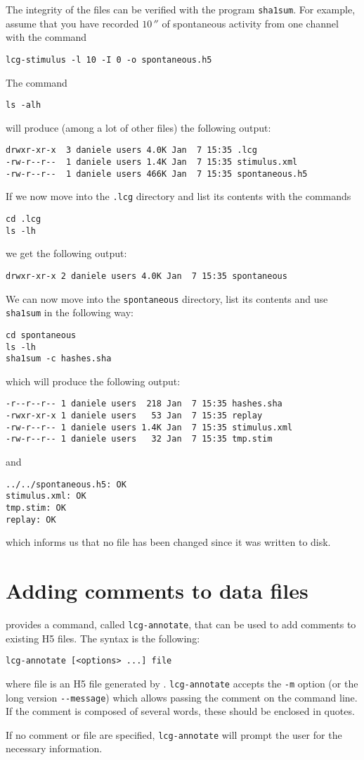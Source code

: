 The integrity of the files can be verified with the program
\verb+sha1sum+. For example, assume that you have recorded
$10\,\second$ of spontaneous activity from one channel with the
command
\begin{lstlisting}
lcg-stimulus -l 10 -I 0 -o spontaneous.h5
\end{lstlisting}
The command
\begin{lstlisting}
ls -alh
\end{lstlisting}
will produce (among a lot of other files) the following output:
\begin{verbatim}
drwxr-xr-x  3 daniele users 4.0K Jan  7 15:35 .lcg
-rw-r--r--  1 daniele users 1.4K Jan  7 15:35 stimulus.xml
-rw-r--r--  1 daniele users 466K Jan  7 15:35 spontaneous.h5
\end{verbatim}
If we now move into the \verb+.lcg+ directory and list its contents
with the commands
\begin{lstlisting}
cd .lcg
ls -lh
\end{lstlisting}
we get the following output:
\begin{verbatim}
drwxr-xr-x 2 daniele users 4.0K Jan  7 15:35 spontaneous
\end{verbatim}
We can now move into the \verb+spontaneous+ directory, list its
contents and use \verb+sha1sum+ in the following way:
\begin{lstlisting}
cd spontaneous
ls -lh
sha1sum -c hashes.sha
\end{lstlisting}
which will produce the following output:
\begin{verbatim}
-r--r--r-- 1 daniele users  218 Jan  7 15:35 hashes.sha
-rwxr-xr-x 1 daniele users   53 Jan  7 15:35 replay
-rw-r--r-- 1 daniele users 1.4K Jan  7 15:35 stimulus.xml
-rw-r--r-- 1 daniele users   32 Jan  7 15:35 tmp.stim
\end{verbatim}
and
\begin{verbatim}
../../spontaneous.h5: OK
stimulus.xml: OK
tmp.stim: OK
replay: OK
\end{verbatim}
which informs us that no file has been changed since it was
written to disk.

\section{Adding comments to data files}
\progname provides a command, called \verb+lcg-annotate+, that can be
used to add comments to existing H5 files. The syntax is the
following:
\begin{verbatim}
lcg-annotate [<options> ...] file
\end{verbatim}
where file is an H5 file generated by \progname. \verb+lcg-annotate+
accepts the \verb+-m+ option (or the long version \verb+--message+)
which allows passing the comment on the command line. If the comment
is composed of several words, these should be enclosed in quotes.

If no comment or file are specified, \verb+lcg-annotate+ will prompt
the user for the necessary information.
